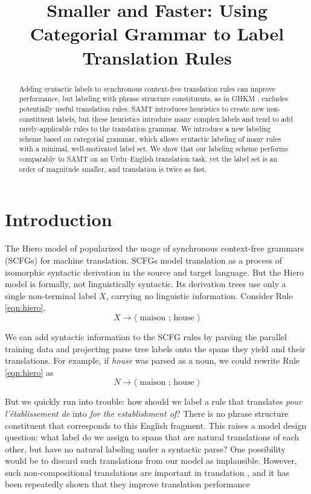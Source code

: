 \documentclass[a4paper]{article}
\author{
\anonymize{
Jonathan Weese \and Chris Callison-Burch \and Adam Lopez\\
Department of Computer Science\\
Human Language Technology Center of Excellence\\ %
Johns Hopkins University\\
Baltimore, MD 21218 USA\\
{\tt \{jonny,ccb,alopez\}@cs.jhu.edu}}
}
\title{Smaller and Faster: Using Categorial Grammar to Label Translation Rules}
\begin{document}
\maketitle

\begin{abstract}
Adding syntactic labels to synchronous context-free translation rules can improve performance, but labeling with phrase structure constituents, as in GHKM \cite{ghkm}, excludes potentially useful translation rules. SAMT \cite{samt-wmt06} introduces heuristics to create new non-constituent labels, but these heuristics introduce many complex labels and tend to add rarely-applicable rules to the translation grammar. We introduce a new labeling scheme based on categorial grammar, which allows syntactic labeling of many rules with a minimal, well-motivated label set. We show that our labeling scheme performs comparably to SAMT on an Urdu--English translation task, yet the label set is an order of magnitude smaller, and translation is twice as fast.
\end{abstract}

\section{Introduction}

The Hiero model of  popularized the usage of synchronous context-free grammars (SCFGs) for machine translation. SCFGs model translation as a process of isomorphic syntactic derivation in the source and target language. But the Hiero model is formally, not linguistically syntactic. Its derivation trees use only a single non-terminal label $X$, carrying no linguistic information. Consider Rule \ref{eqn:hiero}.
\begin{equation}
X \to \langle \textrm{ maison ; house } \rangle\label{eqn:hiero}
\end{equation}

We can add syntactic information to the SCFG rules by parsing the parallel training data and projecting parse tree labels onto the spans they yield and their translations. For example, if {\em house} was parsed as a noun, we could rewrite Rule \ref{eqn:hiero} as
\begin{equation*}
N \to \langle \textrm{ maison ; house } \rangle
\end{equation*}

But we quickly run into trouble: how should we label a rule that translates {\em pour l'\'{e}tablissement de} into {\em for the establishment of}? There is no phrase structure constituent that corresponds to this English fragment.
This raises a model design question: what label do we assign to spans that are natural translations of each other, but have no natural labeling under a syntactic parse?
One possibility would be to discard such translations from our model as implausible. However, such non-compositional translations are important in translation \cite{fox:2002:emnlp}, and it has been repeatedly shown that they improve translation performance \cite{koehn-och-marcu-2003,deneefe-syntax-and-phrase-mt} 
\end{document}
